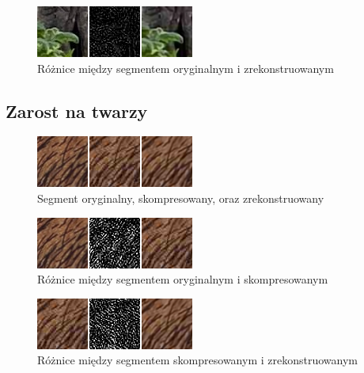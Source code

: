 \documentclass[a4paper, 12pt]{article}
\begin{document}
\begin{figure}[h!]
\begin{center}
	\includegraphics[width=0.85\columnwidth]{orig_vs_rest.png}
	\caption{Różnice między segmentem oryginalnym i zrekonstruowanym}
\end{center}
\end{figure}

\newpage
\subsection{Zarost na twarzy}
\begin{figure}[h!]
\begin{center}
	\includegraphics[width=0.85\columnwidth]{compare_sample2.png}
	\caption{Segment oryginalny, skompresowany, oraz zrekonstruowany}
\end{center}
\end{figure}
\begin{figure}[h!]
\begin{center}
	\includegraphics[width=0.85\columnwidth]{orig_vs_comp2.png}
	\caption{Różnice między segmentem oryginalnym i skompresowanym}
\end{center}
\end{figure}
\begin{figure}[h!]
\begin{center}
	\includegraphics[width=0.85\columnwidth]{comp_vs_rest2.png}
	\caption{Różnice między segmentem skompresowanym i zrekonstruowanym}
\end{center}
\end{figure}
\end{document}
